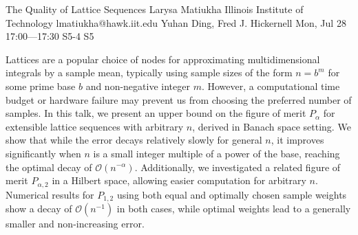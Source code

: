 \begin{talk}
  {The Quality of Lattice Sequences}%
  {Larysa Matiukha}%
  {Illinois Institute of Technology}%
  {lmatiukha@hawk.iit.edu}%
  {Yuhan Ding, Fred J. Hickernell}%
  {}%
  {Mon, Jul 28 17:00---17:30}%
  {S5-4}%
  {S5}%
  
    

Lattices are a popular choice of nodes for approximating multidimensional integrals by a sample mean, typically using sample sizes of the form $n = b^m$ for some prime base $b$ and non-negative integer $m$. However, a computational time budget or hardware failure may prevent us from choosing the preferred number of samples. In this talk, we present an upper bound on the figure of merit $P_\alpha$ for extensible lattice sequences with arbitrary $n$, derived in Banach space setting. We show that while the error decays relatively slowly for general $n$, it improves significantly when $n$ is a small integer multiple of a power of the base, reaching the optimal decay of $\mathcal{O}(n^{-\alpha})$. %
Additionally, we investigated a related figure of merit $P_{\alpha,2}$ in a Hilbert space, allowing easier computation for arbitrary $n$. Numerical results for $P_{1,2}$ using both equal and optimally chosen sample weights show a decay of $\mathcal{O}(n^{-1})$ in both cases, while optimal weights lead to a generally smaller and non-increasing error. 





\end{talk}

